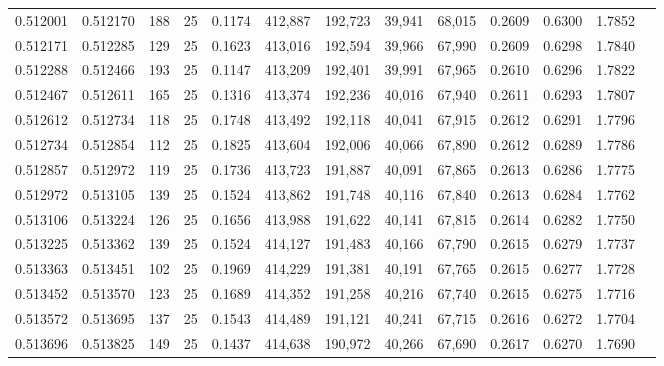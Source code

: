 \begin{tabular}{rrrrrrrrrrrrr}
0.512001 & 0.512170 &   188 &  25 &                                     0.1174 & 412,887 & 192,723 &  39,941 &  68,015 & 0.2609 & 0.6300 & 1.7852 \\
0.512171 & 0.512285 &   129 &  25 &                                     0.1623 & 413,016 & 192,594 &  39,966 &  67,990 & 0.2609 & 0.6298 & 1.7840 \\
0.512288 & 0.512466 &   193 &  25 &                                     0.1147 & 413,209 & 192,401 &  39,991 &  67,965 & 0.2610 & 0.6296 & 1.7822 \\
0.512467 & 0.512611 &   165 &  25 &                                     0.1316 & 413,374 & 192,236 &  40,016 &  67,940 & 0.2611 & 0.6293 & 1.7807 \\
0.512612 & 0.512734 &   118 &  25 &                                     0.1748 & 413,492 & 192,118 &  40,041 &  67,915 & 0.2612 & 0.6291 & 1.7796 \\
0.512734 & 0.512854 &   112 &  25 &                                     0.1825 & 413,604 & 192,006 &  40,066 &  67,890 & 0.2612 & 0.6289 & 1.7786 \\
0.512857 & 0.512972 &   119 &  25 &                                     0.1736 & 413,723 & 191,887 &  40,091 &  67,865 & 0.2613 & 0.6286 & 1.7775 \\
0.512972 & 0.513105 &   139 &  25 &                                     0.1524 & 413,862 & 191,748 &  40,116 &  67,840 & 0.2613 & 0.6284 & 1.7762 \\
0.513106 & 0.513224 &   126 &  25 &                                     0.1656 & 413,988 & 191,622 &  40,141 &  67,815 & 0.2614 & 0.6282 & 1.7750 \\
0.513225 & 0.513362 &   139 &  25 &                                     0.1524 & 414,127 & 191,483 &  40,166 &  67,790 & 0.2615 & 0.6279 & 1.7737 \\
0.513363 & 0.513451 &   102 &  25 &                                     0.1969 & 414,229 & 191,381 &  40,191 &  67,765 & 0.2615 & 0.6277 & 1.7728 \\
0.513452 & 0.513570 &   123 &  25 &                                     0.1689 & 414,352 & 191,258 &  40,216 &  67,740 & 0.2615 & 0.6275 & 1.7716 \\
0.513572 & 0.513695 &   137 &  25 &                                     0.1543 & 414,489 & 191,121 &  40,241 &  67,715 & 0.2616 & 0.6272 & 1.7704 \\
0.513696 & 0.513825 &   149 &  25 &                                     0.1437 & 414,638 & 190,972 &  40,266 &  67,690 & 0.2617 & 0.6270 & 1.7690 \\

\end{tabular}
